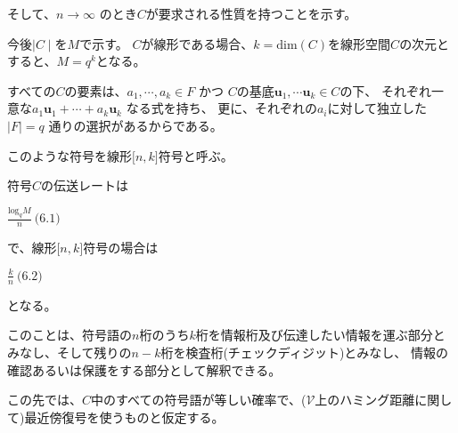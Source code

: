 \documentclass[12pt,a4paper]{article}
\begin{document}
そして、$n \rightarrow \infty$
のとき$C$が要求される性質を持つことを示す。

今後$\mid C \mid$を$M$で示す。
$C$が線形である場合、$k = \text{dim}(C)$を線形空間$C$の次元とすると、$M = q^k$となる。

すべての$C$の要素は、$a_1 , \cdots , a_k \in F$ かつ
$C$の基底$\mathbf{u}_1, \cdots \mathbf{u}_k \in C$の下、
それぞれ一意な$a_1 \mathbf{u}_1 + \cdots + a_k \mathbf{u}_k$
なる式を持ち、 更に、それぞれの$a_i$に対して独立した
$\mid F \mid = q$ 通りの選択があるからである。

このような符号を線形$\lbrack n,k \rbrack$符号と呼ぶ。

符号$C$の伝送レートは

$\frac{\text{log}_q M}{n} \ \text{(6.1)}$

で、線形$\lbrack n,k \rbrack$符号の場合は

$\frac{k}{n} \ \text{(6.2)}$

となる。

このことは、符号語の$n$桁のうち$k$桁を情報桁及び伝達したい情報を運ぶ部分とみなし、そして残りの$n-k$桁を検査桁(チェックディジット)とみなし、
情報の確認あるいは保護をする部分として解釈できる。

この先では、$C$中のすべての符号語が等しい確率で、($\mathcal{V}$上のハミング距離に関して)最近傍復号を使うものと仮定する。
\end{document}

